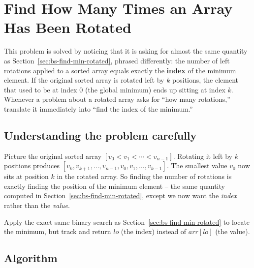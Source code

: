 \section{Find How Many Times an Array Has Been Rotated}
\label{sec:bs-how-many-rotations}


\begin{patternbox}
This problem is solved by noticing that it is asking for almost the same
quantity as Section~\ref{sec:bs-find-min-rotated}, phrased differently: the
number of left rotations applied to a sorted array equals exactly the
\textbf{index} of the minimum element. If the original sorted array is
rotated left by $k$ positions, the element that used to be at index $0$
(the global minimum) ends up sitting at index $k$. Whenever a problem
about a rotated array asks for ``how many rotations,'' translate it
immediately into ``find the index of the minimum.''
\end{patternbox}

\subsection*{Understanding the problem carefully}

Picture the original sorted array $[v_0 < v_1 < \cdots < v_{n-1}]$. Rotating
it left by $k$ positions produces
$[v_k, v_{k+1}, \dots, v_{n-1}, v_0, v_1, \dots, v_{k-1}]$. The smallest
value $v_0$ now sits at position $k$ in the rotated array. So finding the
number of rotations is exactly finding the position of the minimum element
-- the same quantity computed in Section~\ref{sec:bs-find-min-rotated},
except we now want the \emph{index} rather than the \emph{value}.

\begin{ideabox}
Apply the exact same binary search as
Section~\ref{sec:bs-find-min-rotated} to locate the minimum, but track and
return $\textit{lo}$ (the index) instead of $\textit{arr}[\textit{lo}]$
(the value).
\end{ideabox}

\subsection*{Algorithm}

